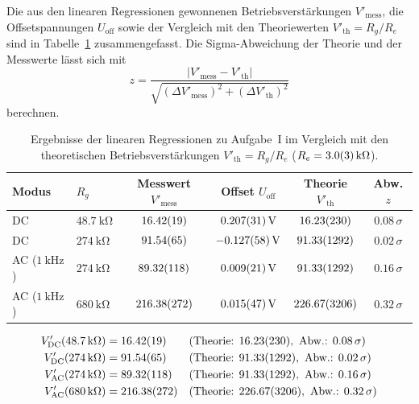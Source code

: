 \documentclass[12pt,a4paper,titlepage]{scrartcl}
\numberwithin{equation}{section}
\numberwithin{table}{section}
\numberwithin{figure}{section}
\begin{document}
Die aus den linearen Regressionen gewonnenen Betriebsverstärkungen $V'_{\text{mess}}$, die Offsetspannungen $U_{\text{off}}$ sowie der Vergleich mit den Theoriewerten $V'_{\text{th}} = R_g / R_e$ sind in Tabelle~\ref{tab:ergebnisse_a1} zusammengefasst. Die Sigma-Abweichung der Theorie und der Messwerte lässt sich mit 
\begin{equation}
    z = \frac{|V'_{\text{mess}} - V'_{\text{th}}|}{\sqrt{(\Delta V'_{\text{mess}})^2 + (\Delta V'_{\text{th}})^2}}
\end{equation}
berechnen.

\begin{table}[H]
    \centering
    \caption{Ergebnisse der linearen Regressionen zu Aufgabe~I im Vergleich mit den theoretischen Betriebsverstärkungen $V'_{\text{th}} = R_g / R_e$ ($R_e = \SI{3.0 +- 0.3}{\kilo\ohm}$).}
    \label{tab:ergebnisse_a1}
    \begin{tabular}{llcccc}
        \toprule
        \textbf{Modus} & \textbf{$R_g$} & \textbf{Messwert $V'_{\text{mess}}$} & \textbf{Offset $U_{\text{off}}$} & \textbf{Theorie $V'_{\text{th}}$} & \textbf{Abw. $z$} \\
        \midrule
        DC & $\SI{48.7}{\kilo\ohm}$ & $\num{16.42 +- 0.19}$ & $\SI{0.207 +- 0.031}{\volt}$ & $\num{16.23 +- 2.30}$ & $\num{0.08}\,\sigma$ \\
        DC & $\SI{274}{\kilo\ohm}$ & $\num{91.54 +- 0.65}$ & $\SI{-0.127 +- 0.058}{\volt}$ & $\num{91.33 +- 12.92}$ & $\num{0.02}\,\sigma$ \\
        AC ($\SI{1}{\kilo\hertz}$) & $\SI{274}{\kilo\ohm}$ & $\num{89.32 +- 1.18}$ & $\SI{0.009 +- 0.021}{\volt}$ & $\num{91.33 +- 12.92}$ & $\num{0.16}\,\sigma$ \\
        AC ($\SI{1}{\kilo\hertz}$) & $\SI{680}{\kilo\ohm}$ & $\num{216.38 +- 2.72}$ & $\SI{0.015 +- 0.047}{\volt}$ & $\num{226.67 +- 32.06}$ & $\num{0.32}\,\sigma$ \\
        \bottomrule
    \end{tabular}
\end{table}

\begin{resultbox}
    \small
    \begin{align*}
        V'_{\text{DC}}(\SI{48.7}{\kilo\ohm}) &= \num{16.42 +- 0.19} & &\text{(Theorie: } \num{16.23 +- 2.30},\ \text{Abw.: } \num{0.08}\,\sigma\text{)}\\
        V'_{\text{DC}}(\SI{274}{\kilo\ohm}) &= \num{91.54 +- 0.65} & &\text{(Theorie: } \num{91.33 +- 12.92},\ \text{Abw.: } \num{0.02}\,\sigma\text{)}\\
        V'_{\text{AC}}(\SI{274}{\kilo\ohm}) &= \num{89.32 +- 1.18} & &\text{(Theorie: } \num{91.33 +- 12.92},\ \text{Abw.: } \num{0.16}\,\sigma\text{)}\\
        V'_{\text{AC}}(\SI{680}{\kilo\ohm}) &= \num{216.38 +- 2.72} & &\text{(Theorie: } \num{226.67 +- 32.06},\ \text{Abw.: } \num{0.32}\,\sigma\text{)}
    \end{align*}
\end{resultbox}
\end{document}
